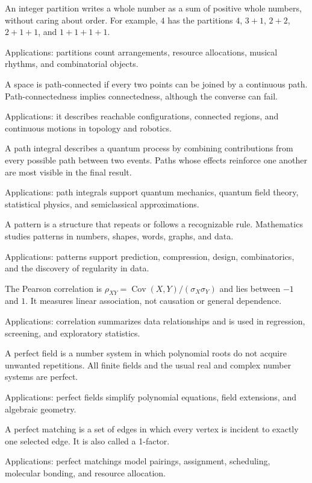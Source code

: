 An integer partition writes a whole number as a sum of positive whole numbers, without caring about order. For example, $4$ has the partitions $4$, $3+1$, $2+2$, $2+1+1$, and $1+1+1+1$. \par\noindent Applications: partitions count arrangements, resource allocations, musical rhythms, and combinatorial objects.

A space is path-connected if every two points can be joined by a continuous path. Path-connectedness implies connectedness, although the converse can fail. \par\noindent Applications: it describes reachable configurations, connected regions, and continuous motions in topology and robotics.

A path integral describes a quantum process by combining contributions from every possible path between two events. Paths whose effects reinforce one another are most visible in the final result. \par\noindent Applications: path integrals support quantum mechanics, quantum field theory, statistical physics, and semiclassical approximations.

A pattern is a structure that repeats or follows a recognizable rule. Mathematics studies patterns in numbers, shapes, words, graphs, and data. \par\noindent Applications: patterns support prediction, compression, design, combinatorics, and the discovery of regularity in data.

The Pearson correlation is $\rho_{XY}=\operatorname{Cov}(X,Y)/(\sigma_X\sigma_Y)$ and lies between $-1$ and $1$. It measures linear association, not causation or general dependence. \par\noindent Applications: correlation summarizes data relationships and is used in regression, screening, and exploratory statistics.

A perfect field is a number system in which polynomial roots do not acquire unwanted repetitions. All finite fields and the usual real and complex number systems are perfect. \par\noindent Applications: perfect fields simplify polynomial equations, field extensions, and algebraic geometry.

A perfect matching is a set of edges in which every vertex is incident to exactly one selected edge. It is also called a 1-factor. \par\noindent Applications: perfect matchings model pairings, assignment, scheduling, molecular bonding, and resource allocation.

